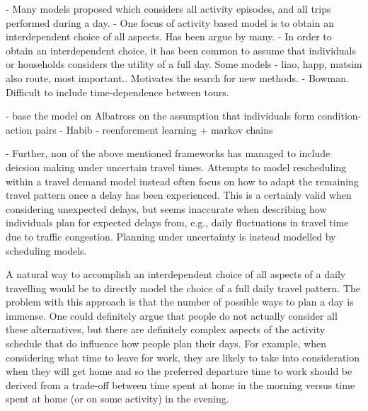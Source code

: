 - Many models proposed which considers all activity episodes, and all trips performed during a day. 
- One focus of activity based model is to obtain an interdependent choice of all aspects. Has been argue by many. 
- In order to obtain an interdependent choice, it has been common to assume that individuals or households considers the utility of a full day. Some models 
- liao, happ, matsim also route, most important.. Motivates the search for new methods. 
- Bowman. Difficult to include time-dependence between tours.

- \citet{timmermans2001modeling} base the model on Albatross on the assumption that individuals form condition-action pairs 
- Habib
- reenforcment learning + markov chains

- Further, non of the above mentioned frameworks has managed to include deicsion making under uncertain travel times. Attempts to model rescheduling within a travel demand model instead often focus on how to adapt the remaining travel pattern once a delay has been experienced. This is a certainly valid when considering unexpected delays, but seems inaccurate when describing how individuals plan for expected delays from, e.g., daily fluctuations in travel time due to traffic congestion. Planning under uncertainty is instead modelled by scheduling models. 



A natural way to accomplish an interdependent choice of all aspects of a daily travelling would be to directly model the choice of a full daily travel pattern.
The problem with this approach is that the number of possible ways to plan a day is immense. One could definitely argue that people do not actually consider all these alternatives, but there are definitely complex aspects of the activity schedule that do influence how people plan their days. For example, when considering what time to leave for work, they are likely to take into consideration when they will get home and so the preferred departure time to work should be derived from a trade-off between time spent at home in the morning versus time spent at home (or on some activity) in the evening.

